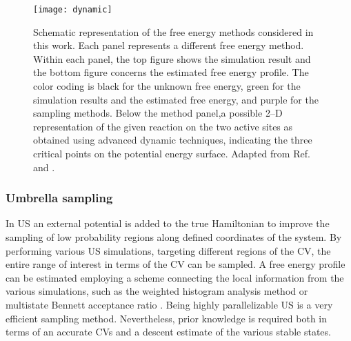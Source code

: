 \begin{figure}[!h]
	\centering
	\texttt{[image: dynamic]}
	\caption[Schematic representation of the free energy methods considered in this work. Each panel represents a different free energy method. Within
each panel, the top figure shows the simulation result and the bottom figure concerns the estimated free energy profile. The color coding is black for
the unknown free energy, green for the simulation results and the estimated free
energy, and purple for the sampling methods. Below the method panel,a possible
2--D representation of the given reaction on the two active sites as obtained using
advanced dynamic techniques, indicating the three critical points on the potential energy surface.]{Schematic representation of the free energy methods considered in
	this work. Each panel represents a different free energy method. Within each panel, the top figure shows the simulation result and the bottom figure concerns the estimated free energy profile. The color coding is black for
the unknown free energy, green for the simulation results and the estimated free
energy, and purple for the sampling methods. Below the method panel,a possible
2--D representation of the given reaction on the two active sites as obtained using
advanced dynamic techniques, indicating the three critical points on the
potential energy surface. Adapted from Ref.\cite{Demuynck2017} and \cite{Rogge2017}.}
	\label{fig:dynamic}
\end{figure}


\subsubsection*{Umbrella sampling}
In US an external potential is added to the true Hamiltonian to improve the
sampling of low probability regions along defined coordinates of the system. By
performing various US simulations, targeting different regions of the CV, the entire range of interest in terms of the CV can be sampled. A free energy profile can be estimated
employing a scheme connecting the local information from the various
simulations, such as the weighted histogram analysis method or multistate
Bennett acceptance ratio \cite{Kumar1992, Patey1975, Torrie1977}. Being highly
parallelizable US is a very efficient sampling method.
Nevertheless, prior knowledge is required both in terms of an accurate
CVs and a descent estimate of the various stable states.


